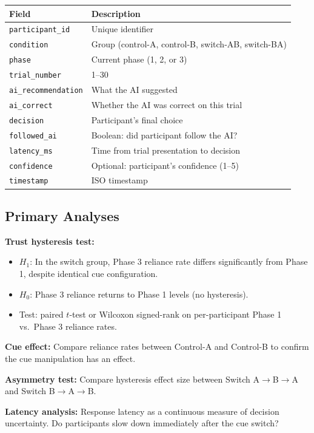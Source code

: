 \documentclass[12pt]{article}
\begin{document}
\begin{table}[H]
\centering
\small
\begin{tabular}{ll}
\toprule
Field & Description \\
\midrule
\texttt{participant\_id} & Unique identifier \\
\texttt{condition} & Group (control-A, control-B, switch-AB, switch-BA) \\
\texttt{phase} & Current phase (1, 2, or 3) \\
\texttt{trial\_number} & 1--30 \\
\texttt{ai\_recommendation} & What the AI suggested \\
\texttt{ai\_correct} & Whether the AI was correct on this trial \\
\texttt{decision} & Participant's final choice \\
\texttt{followed\_ai} & Boolean: did participant follow the AI? \\
\texttt{latency\_ms} & Time from trial presentation to decision \\
\texttt{confidence} & Optional: participant's confidence (1--5) \\
\texttt{timestamp} & ISO timestamp \\
\bottomrule
\end{tabular}
\end{table}

\subsection{Primary Analyses}

\textbf{Trust hysteresis test:}
\begin{itemize}
\item $H_1$: In the switch group, Phase 3 reliance rate differs significantly from Phase 1, despite identical cue configuration.
\item $H_0$: Phase 3 reliance returns to Phase 1 levels (no hysteresis).
\item Test: paired $t$-test or Wilcoxon signed-rank on per-participant Phase 1 vs.\ Phase 3 reliance rates.
\end{itemize}

\textbf{Cue effect:} Compare reliance rates between Control-A and Control-B to confirm the cue manipulation has an effect.

\textbf{Asymmetry test:} Compare hysteresis effect size between Switch A$\to$B$\to$A and Switch B$\to$A$\to$B.

\textbf{Latency analysis:} Response latency as a continuous measure of decision uncertainty. Do participants slow down immediately after the cue switch?
\end{document}
